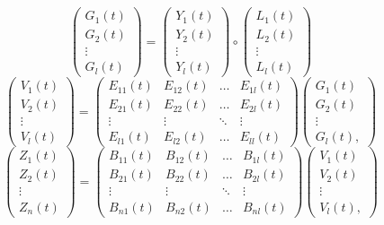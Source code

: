 \documentclass[a4paper,12pt]{elsarticle}
\begin{document}
\vspace{0.1 in}
\begin{equation}
\begin{pmatrix}
G_1(t) \\
G_2(t) \\
\vdots \\
G_l(t)
\end{pmatrix}
=
\begin{pmatrix}
Y_1(t) \\
Y_2(t) \\
\vdots \\
Y_l(t)
\end{pmatrix}
\circ
\begin{pmatrix}
L_1(t) \\
L_2(t) \\
\vdots \\
L_l(t)
\end{pmatrix}
\label{eq:6}
\end{equation}
\vspace{0.2 in}
\begin{equation}
\begin{pmatrix}
V_1(t) \\
V_2(t) \\
\vdots \\
V_l(t)
\end{pmatrix}
=
\begin{pmatrix}
E_{11}(t) & E_{12}(t) & \dots & E_{1l}(t) \\
E_{21}(t) & E_{22}(t) & \dots & E_{2l}(t) \\
\vdots & \vdots & \ddots & \vdots \\
E_{l1}(t) & E_{l2}(t) & \dots & E_{ll}(t)
\end{pmatrix}
\begin{pmatrix}
G_1(t) \\
G_2(t) \\
\vdots \\
G_l(t),
\end{pmatrix}
\end{equation}
\vspace{0.2 in}
\hspace{12 in}\begin{equation}
\begin{pmatrix}
Z_1(t) \\
Z_2(t) \\
\vdots \\
Z_n(t)
\end{pmatrix}
=
\begin{pmatrix}
B_{11}(t) & B_{12}(t) & \dots & B_{1l}(t) \\
B_{21}(t) & B_{22}(t) & \dots & B_{2l}(t) \\
\vdots & \vdots & \ddots & \vdots \\
B_{n1}(t) & B_{n2}(t) & \dots & B_{nl}(t)
\end{pmatrix}
\begin{pmatrix}
V_1(t) \\
V_2(t) \\
\vdots \\
V_l(t),
\end{pmatrix}
\end{equation}
\end{document}
